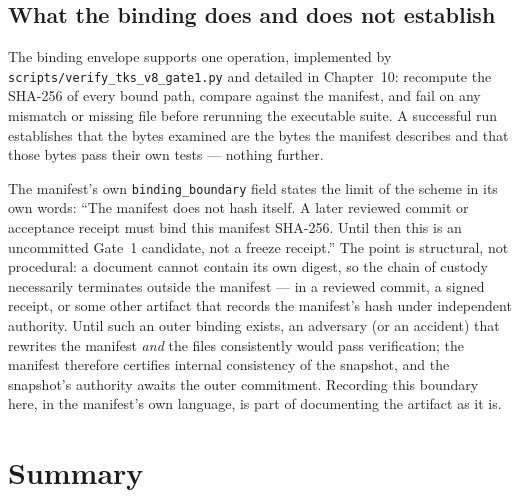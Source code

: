 \subsection{What the binding does and does not establish}

\begin{protocol}\label{ch09:proto:binding}
The binding envelope supports one operation, implemented by
\texttt{scripts/verify\_tks\_v8\_gate1.py} and detailed in Chapter~10:
recompute the SHA-256 of every bound path, compare against the manifest,
and fail on any mismatch or missing file before rerunning the executable
suite. A successful run establishes that the bytes examined are the bytes
the manifest describes and that those bytes pass their own tests ---
nothing further.
\end{protocol}

\begin{boundary}\label{ch09:bdy:self-hash}
The manifest's own \texttt{binding\_boundary} field states the limit of the
scheme in its own words: ``The manifest does not hash itself. A later
reviewed commit or acceptance receipt must bind this manifest SHA-256.
Until then this is an uncommitted Gate~1 candidate, not a freeze
receipt.'' The point is structural, not procedural: a document cannot
contain its own digest, so the chain of custody necessarily terminates
outside the manifest --- in a reviewed commit, a signed receipt, or some
other artifact that records the manifest's hash under independent
authority. Until such an outer binding exists, an adversary (or an
accident) that rewrites the manifest \emph{and} the files consistently
would pass verification; the manifest therefore certifies internal
consistency of the snapshot, and the snapshot's authority awaits the
outer commitment. Recording this boundary here, in the manifest's own
language, is part of documenting the artifact as it is.
\end{boundary}

\section{Summary}\label{ch09:sec:summary}

